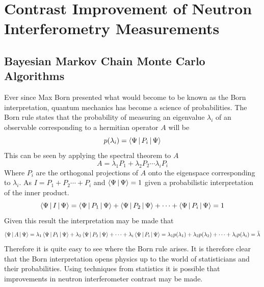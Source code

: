 \chapter{Contrast Improvement of Neutron Interferometry Measurements} %
\label{Chapter2}

\section{Bayesian Markov Chain Monte Carlo Algorithms}
Ever since Max Born presented what would become to be known as the Born interpretation, quantum mechanics has become a science of probabilities. The Born rule states that the probability of measuring an eigenvalue $\lambda_i$  of an observable corresponding to a hermitian operator $A$  will be 
\begin{equation}
p(\lambda_i) = \Braket{\Psi|P_i|\Psi}
\label{eq:bornrule}
\end{equation}
This can be seen by applying the spectral theorem to $A$\cite{linear}
\begin{equation}
A = \lambda_1 P_1 + \lambda_2 P_2 \cdots \lambda_i P_i
\end{equation}
Where $P_i$ are the orthogonal projections of $A$ onto the eigenspace corresponding to $\lambda_i$. As $I = P_1 + P_2 \cdots + P_i$ and $\Braket{\Psi|\Psi} = 1$ given a probabilistic interpretation of the inner product. 
\begin{equation}
\Braket{\Psi|I|\Psi} =\Braket{\Psi|P_1|\Psi} + \Braket{\Psi|P_2|\Psi} + \cdots +\Braket{\Psi|P_i|\Psi}  = 1
\end{equation}
Given this result the interpretation may be made that 
\begin{equation}
\Braket{\Psi|A|\Psi} = \lambda_1 \Braket{\Psi|P_1|\Psi} + \lambda_2\Braket{\Psi|P_2|\Psi} + \cdots +\lambda_i\Braket{\Psi|P_i|\Psi} =\lambda_1 p(\lambda_1) + \lambda_2p(\lambda_2) + \cdots +\lambda_ip(\lambda_i) = \bar{\lambda} 
\label{eq:quantumExpectation}
\end{equation}
Therefore it is quite easy to see where the Born rule arises. It is therefore clear that the Born interpretation opens physics up to the world of statisticians and their probabilities. Using techniques from statistics it is possible that improvements in neutron interferometer contrast may be made. 
